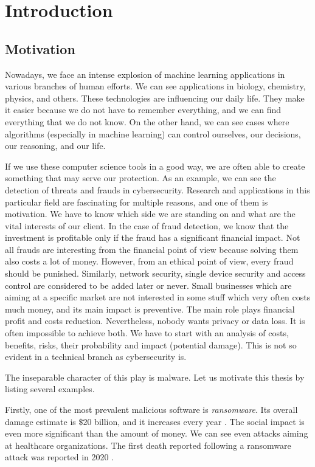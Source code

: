 \chapter{Introduction} \label{chap:intro}
\section*{Motivation}
Nowadays, we face an intense explosion of machine learning applications in various branches of human efforts. We can see applications in biology, chemistry, physics, and others. These technologies are influencing our daily life. They make it easier because we do not have to remember everything, and we can find everything that we do not know. On the other hand, we can see cases where algorithms (especially in machine learning) can control ourselves, our decisions, our reasoning, and our life.

If we use these computer science tools in a good way, we are often able to create something that may serve our protection. As an example, we can see the detection of threats and frauds in cybersecurity. Research and applications in this particular field are fascinating for multiple reasons, and one of them is motivation. We have to know which side we are standing on and what are the vital interests of our client.  In the case of fraud detection, we know that the investment is profitable only if the fraud has a significant financial impact. Not all frauds are interesting from the financial point of view because solving them also costs a lot of money. However, from an ethical point of view, every fraud should be punished. Similarly, network security, single device security and access control are considered to be added later or never. Small businesses which are aiming at a specific market are not interested in some stuff which very often costs much money, and its main impact is preventive. The main role plays financial profit and costs reduction. Nevertheless, nobody wants privacy or data loss. It is often impossible to achieve both. We have to start with an analysis of costs, benefits, risks, their probability and impact (potential damage). This is not so evident in a technical branch as cybersecurity is.

The inseparable character of this play is malware. Let us motivate this thesis by listing several examples.

Firstly, one of the most prevalent malicious software is \emph{ransomware}. Its overall damage estimate is $\$20$ billion, and it increases every year \cite{purplesec2021}. The social impact is even more significant than the amount of money. We can see even attacks aiming at healthcare organizations. The first death reported following a ransomware attack was reported in 2020 \cite{Cimpanu2020}.

